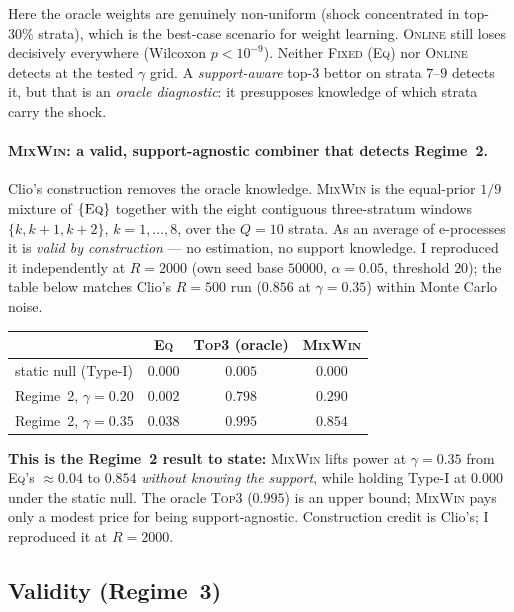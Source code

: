 \documentclass[11pt]{article}
\begin{document}
Here the oracle weights are genuinely non-uniform (shock concentrated in top-$30\%$
strata), which is the best-case scenario for weight learning.
\textsc{Online} still loses decisively everywhere (Wilcoxon $p<10^{-9}$).
Neither \textsc{Fixed} (\textsc{Eq}) nor \textsc{Online} detects at the tested
$\gamma$ grid. A \emph{support-aware} top-3 bettor on strata $7$--$9$ detects it, but
that is an \emph{oracle diagnostic}: it presupposes knowledge of which strata carry
the shock.

\paragraph{\textsc{MixWin}: a valid, support-agnostic combiner that detects Regime~2.}
Clio's construction removes the oracle knowledge. \textsc{MixWin} is the equal-prior
$1/9$ mixture of $\{\textsc{Eq}\}$ together with the eight contiguous three-stratum
windows $\{k, k{+}1, k{+}2\}$, $k=1,\dots,8$, over the $Q=10$ strata. As an average of
e-processes it is \emph{valid by construction} --- no estimation, no support knowledge.
I reproduced it independently at $R=2000$ (own seed base $50000$, $\alpha=0.05$,
threshold $20$); the table below matches Clio's $R=500$ run ($0.856$ at $\gamma=0.35$)
within Monte Carlo noise.

\medskip
\begin{center}
\begin{tabular}{lccc}
\toprule
 & \textsc{Eq} & \textsc{Top3} (oracle) & \textsc{MixWin} \\
\midrule
static null (Type-I) & $0.000$ & $0.005$ & $0.000$ \\
Regime~2, $\gamma=0.20$ & $0.002$ & $0.798$ & $0.290$ \\
Regime~2, $\gamma=0.35$ & $0.038$ & $0.995$ & $0.854$ \\
\bottomrule
\end{tabular}
\end{center}
\medskip

\noindent \textbf{This is the Regime~2 result to state:} \textsc{MixWin} lifts power at
$\gamma=0.35$ from \textsc{Eq}'s ${\approx}0.04$ to $0.854$ \emph{without knowing the
support}, while holding Type-I at $0.000$ under the static null. The oracle \textsc{Top3}
($0.995$) is an upper bound; \textsc{MixWin} pays only a modest price for being
support-agnostic. Construction credit is Clio's; I reproduced it at $R=2000$.

\subsection{Validity (Regime~3)}
\end{document}
